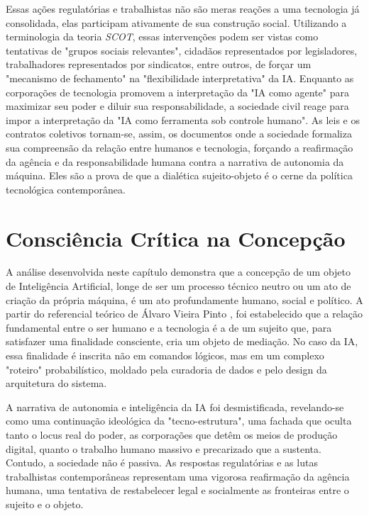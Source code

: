 Essas ações regulatórias e trabalhistas não são meras reações a uma tecnologia já consolidada, 
elas participam ativamente de sua construção social. Utilizando a terminologia da 
teoria \textit{SCOT}, essas intervenções podem ser vistas como tentativas de "grupos sociais relevantes", cidadãos representados por legisladores, trabalhadores representados por 
sindicatos, entre outros, de forçar um "mecanismo de fechamento" na "flexibilidade interpretativa" da IA. 
Enquanto as corporações de tecnologia promovem a interpretação da 
"IA como agente" para maximizar seu poder e diluir sua responsabilidade, a sociedade civil reage para impor a interpretação da "IA como ferramenta sob controle humano". 
As leis 
e os contratos coletivos tornam-se, assim, os documentos onde a sociedade formaliza sua compreensão da relação entre humanos e tecnologia, forçando a reafirmação da agência e da 
responsabilidade humana contra a narrativa de autonomia da máquina. 
Eles são a prova de que a dialética sujeito-objeto é o cerne da política tecnológica contemporânea. 

\section{Consciência Crítica na Concepção}\label{sec:consciencia_critica_concepcao}

A análise desenvolvida neste capítulo demonstra que a concepção de um objeto de Inteligência Artificial, longe de ser um processo técnico neutro ou um ato de criação da própria 
máquina, é um ato profundamente humano, social e político. 
A partir do referencial teórico de Álvaro Vieira Pinto \cite{VieiraPinto2005}, foi estabelecido que a relação fundamental entre o ser humano 
e a tecnologia é a de um sujeito que, para satisfazer uma finalidade consciente, cria um objeto de mediação. 
No caso da IA, essa finalidade é inscrita não em comandos lógicos, 
mas em um complexo "roteiro" probabilístico, moldado pela curadoria de dados e pelo design da arquitetura do sistema. 

A narrativa de autonomia e inteligência da IA foi desmistificada, revelando-se como uma continuação ideológica da "tecno-estrutura", uma fachada que oculta tanto o locus real 
do poder, as corporações que detêm os meios de produção digital, quanto o trabalho humano massivo e precarizado que a sustenta. 
Contudo, a sociedade não é passiva. As 
respostas regulatórias e as lutas trabalhistas contemporâneas representam uma vigorosa reafirmação da agência humana, uma tentativa de restabelecer legal e socialmente as 
fronteiras entre o sujeito e o objeto. 

